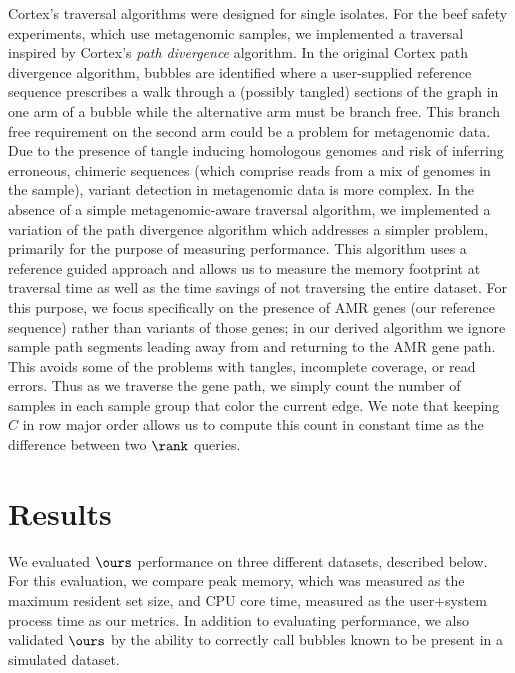 \documentclass[doctor]{thesis}
\begin{document}
{\sc Cortex}'s traversal algorithms were designed for single isolates. For the beef safety experiments, which use metagenomic samples, we implemented a traversal inspired by {\sc Cortex}'s {\it path divergence} algorithm.  In the original {\sc Cortex} path divergence algorithm, bubbles are identified where a user-supplied reference sequence prescribes a walk through a (possibly tangled) sections of the graph in one arm of a bubble while the alternative arm must be branch free.  This branch free requirement on the second arm could be a problem for metagenomic data. Due to the presence of tangle inducing homologous genomes and risk of inferring erroneous, chimeric sequences (which comprise reads from a mix of genomes in the sample), variant detection in metagenomic data is more complex. In the absence of a simple metagenomic-aware traversal algorithm, we implemented a variation of the path divergence algorithm which addresses a simpler problem, primarily for the purpose of measuring performance.  This algorithm uses a reference guided approach and allows us to measure the memory footprint at traversal time as well as the time savings of not traversing the entire dataset.  For this purpose, we focus specifically on the presence of AMR genes (our reference sequence) rather than variants of those genes; in our derived algorithm we ignore sample path segments leading away from and returning to the AMR gene path.  This avoids some of the problems with tangles, incomplete coverage, or read errors.  Thus as we traverse the gene path, we simply count the number of samples in each sample group that color the current edge.   We note that keeping $C$ in row major order allows us to compute this count in constant time as the difference between two $\rank$ queries.  










 
\makeatletter{}\section{Results}
\label{sec:results} 
We evaluated $\ours$ performance on three different datasets, described below.  For this evaluation, we compare peak memory, which was measured as the maximum resident set size, and CPU core time, measured as the user$+$system process time as our metrics.  In addition to evaluating performance, we also validated $\ours$ by the ability to correctly call bubbles known to be present in a simulated dataset.
\end{document}
